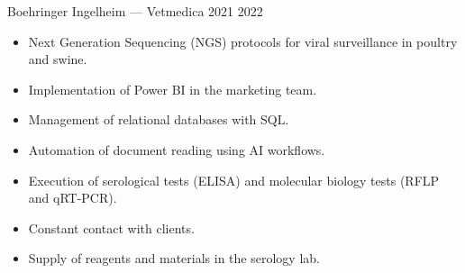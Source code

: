 \documentclass{simplecv}
\begin{document}

        {Boehringer Ingelheim --- Vetmedica}
        {}
        {2021}
        {2022}
        {%
            \vspace{-11pt}
            \begin{itemize}[leftmargin=*]
            \setlength{\itemsep}{0cm}
                \item Next Generation Sequencing (NGS) protocols for viral surveillance in poultry and swine.
                \item Implementation of Power BI in the marketing team.
                \item Management of relational databases with SQL.
                \item Automation of document reading using AI workflows.
                \item Execution of serological tests (ELISA) and molecular biology tests (RFLP and qRT-PCR).
                \item Constant contact with clients.
                \item Supply of reagents and materials in the serology lab.
            \end{itemize}
        }
\end{document}
